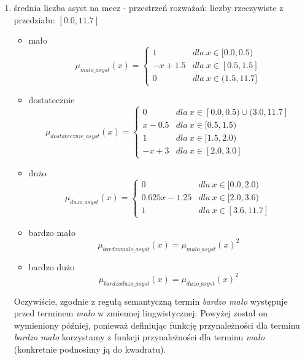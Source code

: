 \documentclass{classrep}
\begin{document}
\begin{enumerate}
    \item średnia liczba asyst na mecz - przestrzeń rozważań: liczby rzeczywiste z przedziału: $[0.0, 11.7]$
    \begin{itemize}
        \item mało
        \begin{equation}
            \mu_{malo\_asyst}(x) = \left\{\begin{matrix} 1 & dla \: x\in[0.0, 0.5) \\ -x + 1.5 & dla \: x\in [0.5, 1.5] \\ 0 & dla \: x\in (1.5,  11.7] \end{matrix}\right.
        \end{equation}
         \item dostatecznie
        \begin{equation}
            \mu_{dostatecznie\_asyst}(x) = \left\{\begin{matrix}0 & dla \: x\in [0.0, 0.5) \cup (3.0, 11.7]\\ x - 0.5 & dla \: x\in[0.5, 1.5) \\ 1 & dla \: x\in [1.5, 2.0) \\ -x + 3 & dla \: x\in [2.0, 3.0] \end{matrix}\right.
        \end{equation}
        \item dużo
        \begin{equation}
            \mu_{duzo\_asyst}(x) = \left\{\begin{matrix}0 & dla \: x\in [0.0, 2.0) \\ 0.625x - 1.25 & dla \: x\in[2.0, 3.6) \\ 1 & dla \: x\in [3.6, 11.7] \end{matrix}\right.
        \end{equation}
        \item bardzo mało
        \begin{equation}
            \mu_{bardzomalo\_asyst}(x) = \mu_{malo\_asyst}(x)^2
        \end{equation}
        \item bardzo dużo
        \begin{equation}
            \mu_{bardzoduzo\_asyst}(x) = \mu_{duzo\_asyst}(x)^2
        \end{equation}
    \end{itemize}
    Oczywiście, zgodnie z regułą semantyczną termin \textit{bardzo mało} występuje przed terminem \textit{mało} w zmiennej lingwistycznej. Powyżej został on wymieniony później, ponieważ definiując funkcję przynależności dla terminu \textit{bardzo mało} korzystamy z funkcji przynależności dla terminu \textit{mało} (konkretnie podnosimy ją do kwadratu).

\end{enumerate}
\end{document}
